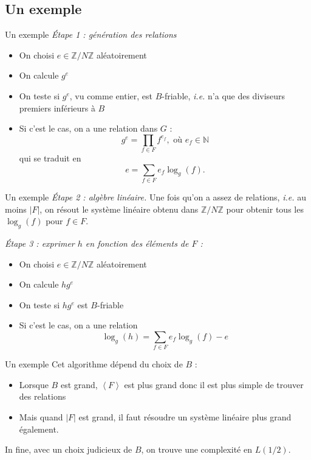 \documentclass[xcolor=x11names,compress]{beamer}
\theoremstyle{break}
\theoremstyle{sc}
\theoremstyle{definition}
\theoremstyle{remark}
\newcommand{\ie}{\emph{i.e. }}
\begin{document}
\subsection{Un exemple}
\begin{frame}{Un exemple}
  \emph{Étape 1 : génération des relations}
  \begin{itemize}
    \item On choisi $e\in \mathbb{Z}/N\mathbb{Z}$ aléatoirement
    \item On calcule $g^e$
    \item On teste si $g^e$, vu comme entier, est $B$-friable, \ie n'a que des
      diviseurs premiers inférieurs à $B$
    \item Si c'est le cas, on a une relation dans $G$ :
      \[ 
        g^e = \prod_{f\in F}f^{e_f}, \text{ où } e_f\in \mathbb{N}
      \]
      qui se traduit en 
      \[
        e = \sum_{f\in F}e_f\log_g(f).
      \]
  \end{itemize}
\end{frame}

\begin{frame}{Un exemple}
  \emph{Étape 2 : algèbre linéaire.} Une fois qu'on a assez de relations, \ie au
  moins $|F|$, on résout le système linéaire obtenu dans
  $\mathbb{Z}/N\mathbb{Z}$ pour obtenir tous les $\log_g(f)$ pour $f\in F$.

  \emph{Étape 3 : exprimer $h$ en fonction des éléments de $F$ :}
  \begin{itemize}
    \item On choisi $e\in \mathbb{Z}/N\mathbb{Z}$ aléatoirement
    \item On calcule $hg^e$
    \item On teste si $hg^e$ est $B$-friable
    \item Si c'est le cas, on a une relation
      \[
      \log_g(h) = \sum_{f\in F}e_f\log_g(f) - e
      \]
  \end{itemize}

\end{frame}

\begin{frame}{Un exemple}
  Cet algorithme dépend du choix de $B$ :
  \begin{itemize}
    \item Lorsque $B$ est grand, $\left\langle F \right\rangle$ est plus grand
      donc il est plus simple de trouver des relations
    \item Mais quand $|F|$ est grand, il faut résoudre un système linéaire plus
      grand également.
  \end{itemize}
  In fine, avec un choix judicieux de $B$, on trouve une complexité en
  $L(1/2)$.
\end{frame}
\end{document}

